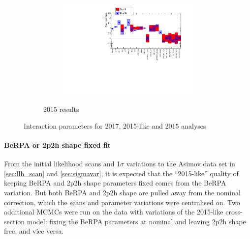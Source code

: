 \begin{figure}[h]
\begin{subfigure}[t]{\textwidth}
	\centering
\begin{subfigure}[t]{0.5\textwidth}
	\includegraphics[width=\textwidth, trim={0mm 0mm 0mm 0mm}, clip]{figures/official/banff_data_paramplot_20160408_03.pdf}
\end{subfigure}
\caption{2015 results}
\end{subfigure}

	\caption{Interaction parameters for 2017, 2015-like and 2015 analyses}
	\label{fig:xsec_data_2015like}
\end{figure}

\paragraph{BeRPA or 2p2h shape fixed fit}
From the initial likelihood scans and 1$\sigma$ variations to the Asimov data set in \autoref{sec:llh_scan} and \autoref{sec:sigmavar}, it is expected that the ``2015-like'' quality of keeping BeRPA and 2p2h shape parameters fixed comes from the BeRPA variation. But both BeRPA and 2p2h shape are pulled away from the nominal correction, which the scans and parameter variations were centralised on. Two additional MCMCs were run on the data with variations of the 2015-like cross-section model: fixing the BeRPA parameters at nominal and leaving 2p2h shape free, and vice versa. 

